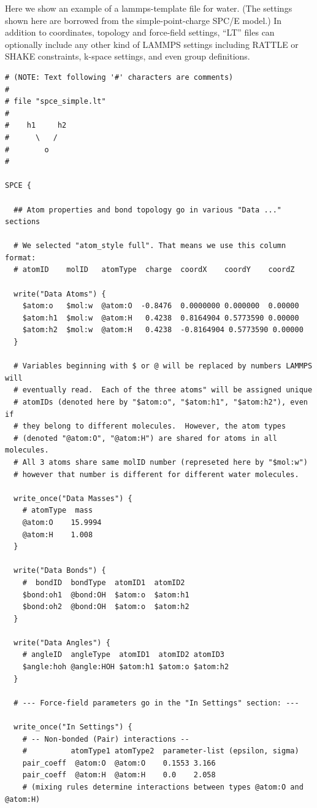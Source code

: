\documentclass[11pt]{article}
\begin{document}
  Here we show an example of a lammps-template file for water.
(The settings shown here are borrowed from the simple-point-charge 
 \cite{Berendsen++StraatsmaJPhysChem1987} SPC/E model.) 
In addition to coordinates, topology and force-field settings, 
``LT'' files can optionally include any other kind of LAMMPS settings
including RATTLE or SHAKE constraints, k-space settings, and even group definitions.
\begin{verbatim}
# (NOTE: Text following '#' characters are comments)
#
# file "spce_simple.lt" 
#
#    h1     h2
#      \   /
#        o
#

SPCE {

  ## Atom properties and bond topology go in various "Data ..." sections

  # We selected "atom_style full". That means we use this column format:
  # atomID    molID   atomType  charge  coordX    coordY    coordZ

  write("Data Atoms") {
    $atom:o   $mol:w  @atom:O  -0.8476  0.0000000 0.000000  0.00000
    $atom:h1  $mol:w  @atom:H   0.4238  0.8164904 0.5773590 0.00000
    $atom:h2  $mol:w  @atom:H   0.4238  -0.8164904 0.5773590 0.00000
  }

  # Variables beginning with $ or @ will be replaced by numbers LAMMPS will
  # eventually read.  Each of the three atoms" will be assigned unique
  # atomIDs (denoted here by "$atom:o", "$atom:h1", "$atom:h2"), even if
  # they belong to different molecules.  However, the atom types
  # (denoted "@atom:O", "@atom:H") are shared for atoms in all molecules.
  # All 3 atoms share same molID number (represeted here by "$mol:w")
  # however that number is different for different water molecules.

  write_once("Data Masses") {
    # atomType  mass
    @atom:O    15.9994
    @atom:H    1.008
  }

  write("Data Bonds") {
    #  bondID  bondType  atomID1  atomID2
    $bond:oh1  @bond:OH  $atom:o  $atom:h1
    $bond:oh2  @bond:OH  $atom:o  $atom:h2
  }

  write("Data Angles") {
    # angleID  angleType  atomID1  atomID2 atomID3
    $angle:hoh @angle:HOH $atom:h1 $atom:o $atom:h2
  }

  # --- Force-field parameters go in the "In Settings" section: ---

  write_once("In Settings") {
    # -- Non-bonded (Pair) interactions --
    #          atomType1 atomType2  parameter-list (epsilon, sigma)
    pair_coeff  @atom:O  @atom:O    0.1553 3.166 
    pair_coeff  @atom:H  @atom:H    0.0    2.058
    # (mixing rules determine interactions between types @atom:O and @atom:H)


\end{verbatim}
\end{document}

